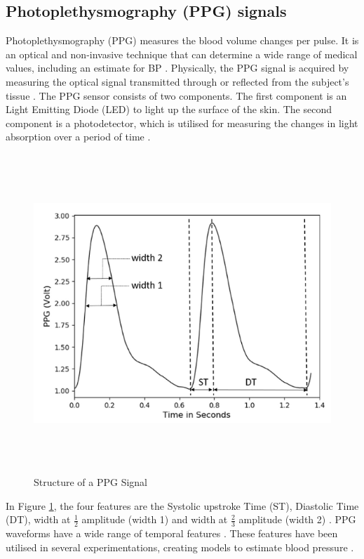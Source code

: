 \documentclass[11pt, a4paper]{article}
\begin{document}
\subsection{Photoplethysmography (PPG) signals} 
Photoplethysmography (PPG) measures the blood volume changes per pulse. It is an optical and non-invasive technique that can determine a wide range of medical values, including an estimate for BP \cite{ElHajj2020}. Physically, the PPG signal is acquired by measuring the optical signal transmitted through or reflected  from  the  subject’s tissue \cite{Tanveer2018}. The PPG sensor consists of two components. The first component is an Light Emitting Diode (LED) to light up the surface of the skin. The second component is a photodetector, which is utilised for measuring the changes in light absorption over a period of time \cite{ElHajj2020} \cite{Kumar2015}. \begin{figure}[H]
    \centering
    \includegraphics[width=12cm,height=12cm,keepaspectratio]{Figures/ppg.png}
    \caption{Structure of a PPG Signal \cite{ElHajj2020}}
    \label{ppg}
\end{figure} \noindent In Figure \ref{ppg}, the four features are the Systolic upstroke Time (ST), Diastolic Time (DT), width at $\frac{1}{2}$ amplitude (width 1) and width at $\frac{2}{3}$ amplitude (width 2) \cite{ElHajj2020}. PPG waveforms have a wide range of temporal features \cite{ElHajj2020}. These features have been utilised in several experimentations, creating  models  to  estimate blood pressure \cite{Pradenas2020}.
\end{document}
